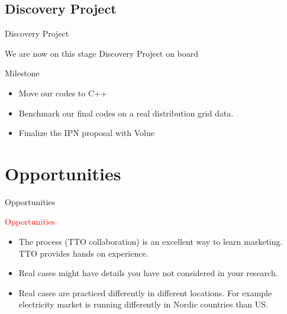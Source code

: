 \documentclass[12pt]{beamer}
\begin{document}
\subsection{Discovery Project}
\begin{frame}{Discovery Project}
\begin{block}{
We are now on this stage}
Discovery Project on board
\end{block}
\begin{alertblock}{Milestone}
\begin{itemize}
\item Move our codes to C++
\item Benchmark our final codes on a real distribution grid data.
\item Finalize the IPN proposal with Volue
\end{itemize}
\end{alertblock}
\end{frame}
\section{Opportunities}
\begin{frame}{Opportunities}
\begin{alertblock}{\textcolor{red}{Opportunities}}
\begin{itemize}
\item The process (TTO collaboration) is an excellent way to learn marketing. TTO provides hands on experience.
\item Real cases might have details you have not considered in your research.
\item Real cases are practiced differently in different locations. For example electricity market is running differently in Nordic countries than US.
\end{itemize}
\end{alertblock}
\end{frame}


\end{document}
